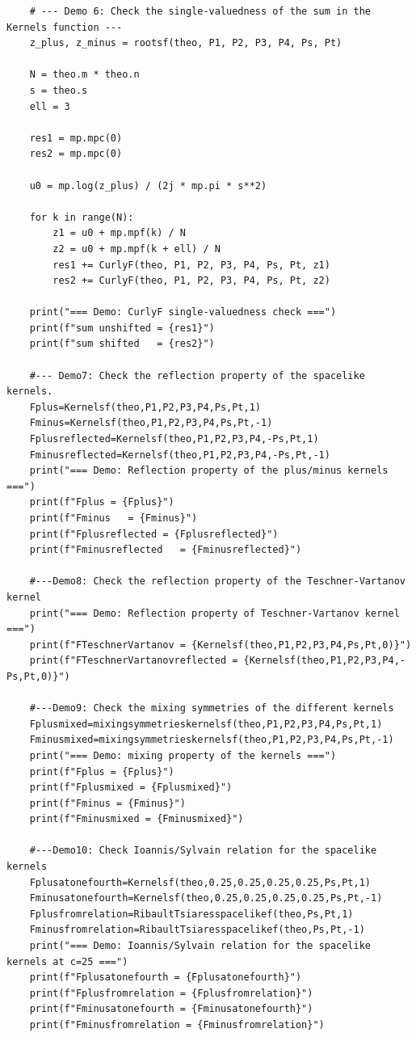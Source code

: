 \documentclass[11pt]{article}
\begin{document}
\begin{lstlisting}
    # --- Demo 6: Check the single-valuedness of the sum in the Kernels function ---
    z_plus, z_minus = rootsf(theo, P1, P2, P3, P4, Ps, Pt)

    N = theo.m * theo.n
    s = theo.s
    ell = 3

    res1 = mp.mpc(0)
    res2 = mp.mpc(0)

    u0 = mp.log(z_plus) / (2j * mp.pi * s**2)

    for k in range(N):
        z1 = u0 + mp.mpf(k) / N
        z2 = u0 + mp.mpf(k + ell) / N
        res1 += CurlyF(theo, P1, P2, P3, P4, Ps, Pt, z1)
        res2 += CurlyF(theo, P1, P2, P3, P4, Ps, Pt, z2)

    print("=== Demo: CurlyF single-valuedness check ===")
    print(f"sum unshifted = {res1}")
    print(f"sum shifted   = {res2}")

    #--- Demo7: Check the reflection property of the spacelike kernels.
    Fplus=Kernelsf(theo,P1,P2,P3,P4,Ps,Pt,1)
    Fminus=Kernelsf(theo,P1,P2,P3,P4,Ps,Pt,-1)
    Fplusreflected=Kernelsf(theo,P1,P2,P3,P4,-Ps,Pt,1)
    Fminusreflected=Kernelsf(theo,P1,P2,P3,P4,-Ps,Pt,-1)
    print("=== Demo: Reflection property of the plus/minus kernels ===")
    print(f"Fplus = {Fplus}")
    print(f"Fminus   = {Fminus}")
    print(f"Fplusreflected = {Fplusreflected}")
    print(f"Fminusreflected   = {Fminusreflected}")

    #---Demo8: Check the reflection property of the Teschner-Vartanov kernel
    print("=== Demo: Reflection property of Teschner-Vartanov kernel ===")
    print(f"FTeschnerVartanov = {Kernelsf(theo,P1,P2,P3,P4,Ps,Pt,0)}")
    print(f"FTeschnerVartanovreflected = {Kernelsf(theo,P1,P2,P3,P4,-Ps,Pt,0)}")

    #---Demo9: Check the mixing symmetries of the different kernels
    Fplusmixed=mixingsymmetrieskernelsf(theo,P1,P2,P3,P4,Ps,Pt,1)
    Fminusmixed=mixingsymmetrieskernelsf(theo,P1,P2,P3,P4,Ps,Pt,-1)
    print("=== Demo: mixing property of the kernels ===")
    print(f"Fplus = {Fplus}")
    print(f"Fplusmixed = {Fplusmixed}")
    print(f"Fminus = {Fminus}")
    print(f"Fminusmixed = {Fminusmixed}")

    #---Demo10: Check Ioannis/Sylvain relation for the spacelike kernels
    Fplusatonefourth=Kernelsf(theo,0.25,0.25,0.25,0.25,Ps,Pt,1)
    Fminusatonefourth=Kernelsf(theo,0.25,0.25,0.25,0.25,Ps,Pt,-1)
    Fplusfromrelation=RibaultTsiaresspacelikef(theo,Ps,Pt,1)
    Fminusfromrelation=RibaultTsiaresspacelikef(theo,Ps,Pt,-1)
    print("=== Demo: Ioannis/Sylvain relation for the spacelike kernels at c=25 ===")
    print(f"Fplusatonefourth = {Fplusatonefourth}")
    print(f"Fplusfromrelation = {Fplusfromrelation}")
    print(f"Fminusatonefourth = {Fminusatonefourth}")
    print(f"Fminusfromrelation = {Fminusfromrelation}")


\end{lstlisting}
\end{document}
